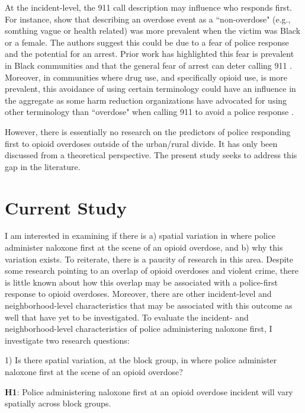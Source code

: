 At the incident-level, the 911 call description may influence who responds first. For instance, \textcite{atkins_disparities_2024} show that describing an overdose event as a ``non-overdose" (e.g., somthing vague or health related) was more prevalent when the victim was Black or a female. The authors suggest this could be due to a fear of police response and the potential for an arrest. Prior work has highlighted this fear is prevalent in Black communities \parencite{wagner_post-overdose_2019} and that the general fear of arrest can deter calling 911 \parencite{van_der_meulen_thats_2021}. Moreover, in communities where drug use, and specifically opioid use, is more prevalent, this avoidance of using certain terminology could have an influence in the aggregate as some harm reduction organizations have advocated for using other terminology than ``overdose" when calling 911 to avoid a police response \parencite{zagorski_how_2021}.

However, there is essentially no research on the predictors of police responding first to opioid overdoses outside of the urban/rural divide. It has only been discussed from a theoretical perspective. The present study seeks to address this gap in the literature. 

\section{\centering Current Study}

I am interested in examining if there is a) spatial variation in where police administer naloxone first at the scene of an opioid overdose, and b) why this variation exists. To reiterate, there is a paucity of research in this area. Despite some research pointing to an overlap of opioid overdoses and violent crime, there is little known about how this overlap may be associated with a police-first response to opioid overdoses. Moreover, there are other incident-level and neighborhood-level characteristics that may be associated with this outcome as well that have yet to be investigated. To evaluate the incident- and neighborhood-level characteristics of police administering naloxone first, I investigate two research questions:

1) Is there spatial variation, at the block group, in where police administer naloxone first at the scene of an opioid overdose? 

\begin{flushleft}
\noindent \textbf{H1}: Police administering naloxone first at an opioid overdose incident will vary spatially across block groups. 
\end{flushleft}

